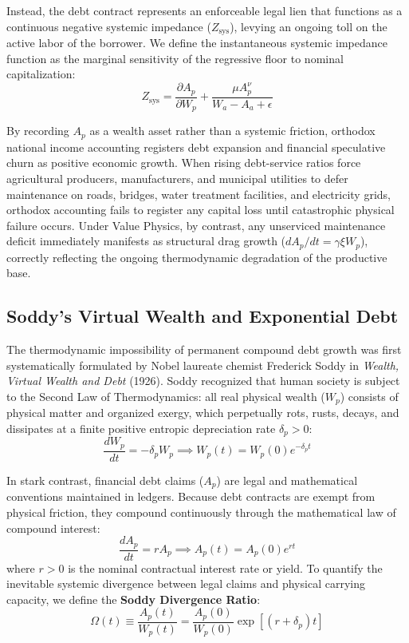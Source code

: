 \documentclass[preprint,12pt,authoryear]{elsarticle}
\theoremstyle{definition}
\begin{document}
Instead, the debt contract represents an enforceable legal lien that functions as a continuous negative systemic impedance ($Z_{\text{sys}}$), levying an ongoing toll on the active labor of the borrower. We define the instantaneous systemic impedance function as the marginal sensitivity of the regressive floor to nominal capitalization:
\begin{equation}
Z_{\text{sys}} = \frac{\partial A_p}{\partial W_p} + \frac{\mu A_p^\nu}{W_a - A_a + \epsilon} \label{eq:systemic_impedance}
\end{equation}

By recording $A_p$ as a wealth asset rather than a systemic friction, orthodox national income accounting registers debt expansion and financial speculative churn as positive economic growth. When rising debt-service ratios force agricultural producers, manufacturers, and municipal utilities to defer maintenance on roads, bridges, water treatment facilities, and electricity grids, orthodox accounting fails to register any capital loss until catastrophic physical failure occurs. Under Value Physics, by contrast, any unserviced maintenance deficit immediately manifests as structural drag growth ($dA_p/dt = \gamma \xi W_p$), correctly reflecting the ongoing thermodynamic degradation of the productive base.

\subsection{Soddy's Virtual Wealth and Exponential Debt}

The thermodynamic impossibility of permanent compound debt growth was first systematically formulated by Nobel laureate chemist Frederick Soddy in \textit{Wealth, Virtual Wealth and Debt} (1926). Soddy recognized that human society is subject to the Second Law of Thermodynamics: all real physical wealth ($W_p$) consists of physical matter and organized exergy, which perpetually rots, rusts, decays, and dissipates at a finite positive entropic depreciation rate $\delta_p > 0$:
\begin{equation}
\frac{dW_p}{dt} = -\delta_p W_p \implies W_p(t) = W_p(0) e^{-\delta_p t} \label{eq:soddy_physical_decay}
\end{equation}

In stark contrast, financial debt claims ($A_p$) are legal and mathematical conventions maintained in ledgers. Because debt contracts are exempt from physical friction, they compound continuously through the mathematical law of compound interest:
\begin{equation}
\frac{dA_p}{dt} = r A_p \implies A_p(t) = A_p(0) e^{r t} \label{eq:soddy_debt_compound}
\end{equation}
where $r > 0$ is the nominal contractual interest rate or yield. To quantify the inevitable systemic divergence between legal claims and physical carrying capacity, we define the \textbf{Soddy Divergence Ratio}:
\begin{equation}
\Omega(t) \equiv \frac{A_p(t)}{W_p(t)} = \frac{A_p(0)}{W_p(0)} \exp\left[ (r + \delta_p) t \right] \label{eq:soddy_ratio}
\end{equation}
\end{document}
